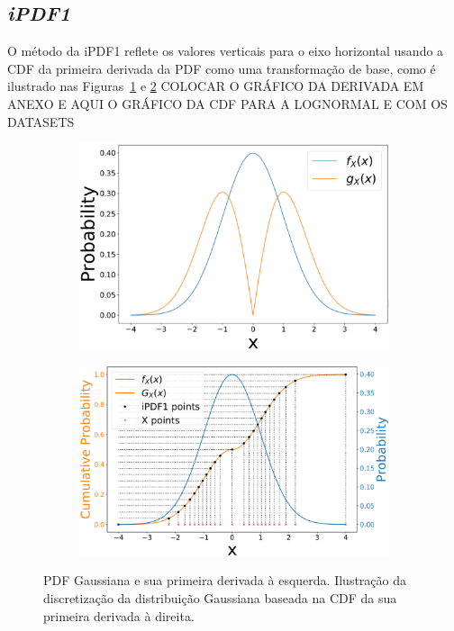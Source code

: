 \subsection{\textit{iPDF1}}

O método da \ac{iPDF1} reflete os valores verticais para o eixo horizontal usando a \ac{CDF} da primeira derivada da \ac{PDF} como uma transformação de base, como é ilustrado nas Figuras~\ref{fig:dPDF1} e \ref{fig:dPDF2}
{\color{red} COLOCAR O GRÁFICO DA DERIVADA EM ANEXO E AQUI O GRÁFICO DA CDF PARA A LOGNORMAL E COM OS DATASETS}
\begin{figure}[!ht]
	\centering
	\begin{subfigure}[b]{0.44\textwidth}
		\centering 
		\includegraphics[width=\textwidth]{./figuras/dpdf1}
		\caption{}
		\label{fig:dPDF1}
	\end{subfigure}
	\hfill
	\begin{subfigure}[b]{0.47\textwidth}
		\centering 
		\includegraphics[width=\textwidth]{./figuras/dpdf2}
		\caption{}
		\label{fig:dPDF2}
	\end{subfigure}
	\caption{PDF Gaussiana e sua primeira derivada à esquerda. Ilustração da discretização da distribuição Gaussiana baseada na CDF da sua primeira derivada à direita.}
	\label{fig:dPDF}
\end{figure}

